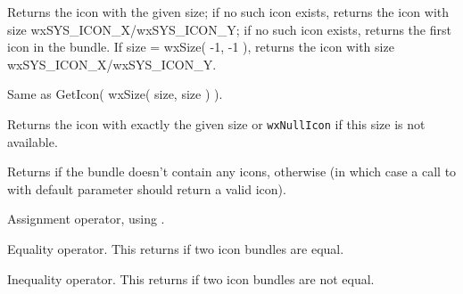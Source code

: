 \label{wxiconbundlegeticon}


Returns the icon with the given size; if no such icon exists,
returns the icon with size wxSYS\_ICON\_X/wxSYS\_ICON\_Y;
if no such icon exists,
returns the first icon in the bundle. If size = wxSize( -1, -1 ),
returns the icon with size wxSYS\_ICON\_X/wxSYS\_ICON\_Y.


Same as GetIcon( wxSize( size, size ) ).


\label{wxiconbundlegeticonofexactsize}


Returns the icon with exactly the given size or \texttt{wxNullIcon} if this
size is not available.


\label{wxiconbundleisempty}


Returns \true if the bundle doesn't contain any icons, \false otherwise (in
which case a call to  with default
parameter should return a valid icon).


\label{wxiconbundleoperatorassign}


Assignment operator, using .


\label{wxiconbundleoperatorequals}


Equality operator. This returns \true if two icon bundles are equal.


\label{wxiconbundleoperatornotequals}


Inequality operator. This returns \true if two icon bundles are not equal.
